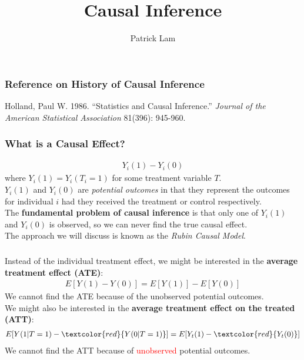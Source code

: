 \documentclass{beamer}
\author{Patrick Lam}
\title{Causal Inference}
\date{}
\begin{document}
\newcommand{\red}{\textcolor{red}}
\newcommand{\blue}{\textcolor{blue}}
\newcommand{\purple}{\textcolor{purple}}

\frame{\titlepage}

\begin{frame}
\frametitle{Reference on History of Causal Inference}
Holland, Paul W. 1986.  ``Statistics and Causal Inference.''  {\it
Journal of the American Statistical Association} 81(396): 945-960. 
\end{frame}

\begin{frame}
\frametitle{What is a Causal Effect?}
\pause
\begin{eqnarray*}
Y_i(1) - Y_i(0)
\end{eqnarray*}
\pause
where $Y_i(1) = Y_i(T_i = 1)$ for some treatment variable $T$. \\
\bigskip
\bigskip
\pause
$Y_i(1)$ and $Y_i(0)$ are {\it potential outcomes} \pause in that they
represent the outcomes for individual $i$ had they received the
treatment or control respectively. \\
\bigskip
\pause
The {\bf fundamental problem of causal inference} is that only one of
$Y_i(1)$ and $Y_i(0)$ is observed, so we can never find the true
causal effect.\\
\pause
\bigskip
The approach we will discuss is known as the {\it Rubin Causal Model}.
\end{frame}

\begin{frame}
\frametitle{}
Instead of the individual treatment effect, we might be interested in
the {\bf average treatment effect (ATE)}: 
\pause
\begin{eqnarray*}
E[Y(1) - Y(0)] = E[Y(1)] - E[Y(0)]
\end{eqnarray*}
\pause
We cannot find the ATE because of the unobserved potential outcomes. \\
\pause
\bigskip
We might also be interested in the {\bf average treatment effect on
the treated (ATT)}:
\pause
\begin{eqnarray*}
E[Y(1|T=1) - \red{Y(0 | T=1)}] = E[Y_t(1) - \red{Y_t(0)}]
\end{eqnarray*}
\pause
We cannot find the ATT because of \red{unobserved} potential outcomes.
\end{frame}
\end{document}
